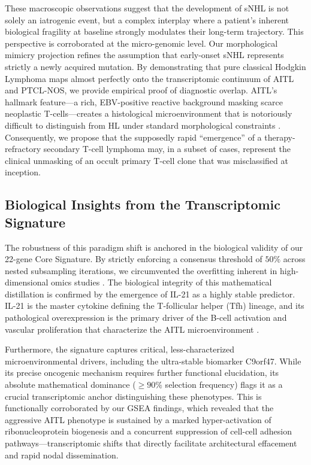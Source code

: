 \documentclass[a4paper,11pt,twocolumn]{article}
\begin{document}
	These macroscopic observations suggest that the development of sNHL is not solely an iatrogenic event, but a complex interplay where a patient's inherent biological fragility at baseline strongly modulates their long-term trajectory. This perspective is corroborated at the micro-genomic level. Our morphological mimicry projection refines the assumption that early-onset sNHL represents strictly a newly acquired mutation. By demonstrating that pure classical Hodgkin Lymphoma maps almost perfectly onto the transcriptomic continuum of AITL and PTCL-NOS, we provide empirical proof of diagnostic overlap. AITL's hallmark feature—a rich, EBV-positive reactive background masking scarce neoplastic T-cells—creates a histological microenvironment that is notoriously difficult to distinguish from HL under standard morphological constraints \cite{Attygalle2002, deLeval2007, Swerdlow2016}. Consequently, we propose that the supposedly rapid ``emergence'' of a therapy-refractory secondary T-cell lymphoma may, in a subset of cases, represent the clinical unmasking of an occult primary T-cell clone that was misclassified at inception.
	
	\subsection{Biological Insights from the Transcriptomic Signature}
	The robustness of this paradigm shift is anchored in the biological validity of our 22-gene Core Signature. By strictly enforcing a consensus threshold of $50\%$ across nested subsampling iterations, we circumvented the overfitting inherent in high-dimensional omics studies \cite{Meinshausen2010}. The biological integrity of this mathematical distillation is confirmed by the emergence of IL-21 as a highly stable predictor. IL-21 is the master cytokine defining the T-follicular helper (Tfh) lineage, and its pathological overexpression is the primary driver of the B-cell activation and vascular proliferation that characterize the AITL microenvironment \cite{Lemonnier2012, deLeval2007}. 
	
	Furthermore, the signature captures critical, less-characterized microenvironmental drivers, including the ultra-stable biomarker C9orf47. While its precise oncogenic mechanism requires further functional elucidation, its absolute mathematical dominance ($\ge 90\%$ selection frequency) flags it as a crucial transcriptomic anchor distinguishing these phenotypes. This is functionally corroborated by our GSEA findings, which revealed that the aggressive AITL phenotype is sustained by a marked hyper-activation of ribonucleoprotein biogenesis and a concurrent suppression of cell-cell adhesion pathways—transcriptomic shifts that directly facilitate architectural effacement and rapid nodal dissemination.
	
\end{document}
